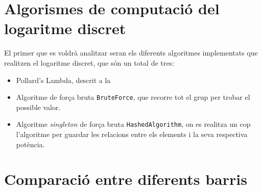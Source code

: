 \section{Algorismes de computació del logaritme discret}
El primer que es voldrà analitzar seran els diferents algoritmes implementats que realitzen el logaritme discret, que són un total de tres:
\begin{itemize}
	\item Pollard's Lambda, descrit a la
	\item Algoritme de força bruta \texttt{BruteForce}, que recorre tot el grup per trobar el possible valor.
	\item Algoritme \textit{singleton} de força bruta \texttt{HashedAlgorithm}, on es realitza un cop l'algoritme per guardar les relacions entre els elements i la seva respectiva potència.
\end{itemize}

\section{Comparació entre diferents barris}
